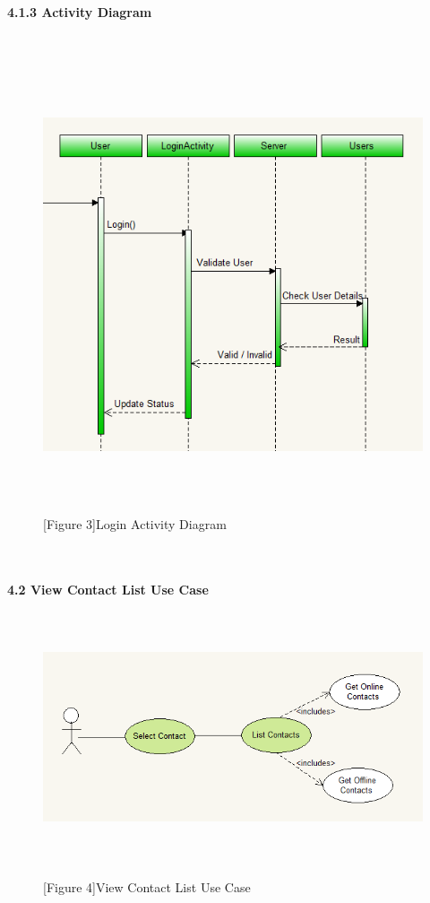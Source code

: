 \documentclass[29pt,a4paper]{moderncv}
\begin{document}
\newpage	
			\left\textbf{4.1.3 Activity Diagram}\\
			\\ \begin{figure}
				\centering
			\\	\includegraphics[width=5.5in, height=5.0in]{./loginActivity1.png}
				\\\caption{[Figure 3]Login Activity Diagram}
			\end{figure}	\\

\newpage
	\\ \left\textbf{4.2 View Contact List Use Case} \\
		\begin{figure}
			\centering
			\\ \includegraphics[width=6.0in, height=2.5in]{./viewContactsCase.png} \\
			\\\caption{[Figure 4]View Contact List Use Case}
		\end{figure}\\
		
\end{document}
